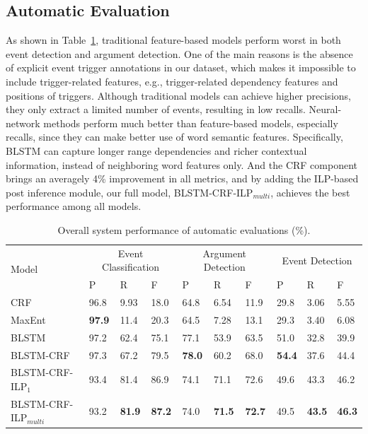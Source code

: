 \subsection{Automatic Evaluation}
As shown in Table~\ref{tab:1}, traditional feature-based models perform worst in both event detection and argument detection. 
One of the main reasons is the absence of explicit event trigger annotations in our dataset, which makes it impossible to include trigger-related features, e.g., trigger-related dependency features and positions of triggers. 
Although traditional models can achieve higher precisions, they only extract a limited number of events, resulting in low recalls. 
Neural-network methods perform much better than feature-based models, especially recalls, since they can make better use of word semantic features. Specifically, BLSTM can capture longer range dependencies and richer contextual information, instead of neighboring word features only.
And the CRF component brings an averagely 4\% improvement in all metrics, and by adding the ILP-based post inference module, our full model, BLSTM-CRF-ILP$_{multi}$, achieves the best performance among all models. 

\begin{table}[!t]
\centering
\small
\begin{tabular}{|l|p{0.8cm}<{\centering}|p{0.8cm}<{\centering}|p{0.8cm}<{\centering}|p{0.8cm}<{\centering}|p{0.8cm}<{\centering}|p{0.8cm}<{\centering}|p{0.8cm}<{\centering}|p{0.8cm}<{\centering}|p{0.8cm}<{\centering}|} \hline
	\multirow{2}{*}{Model} & \multicolumn{3}{c|}{Event Classification} & \multicolumn{3}{c|}{Argument Detection} &
	\multicolumn{3}{c|}{Event Detection} \\ \cline{2-10}
	 & P & R & F & P & R & F & P & R & F \\ \hline
	CRF & 96.8 & 9.93 & 18.0 & 64.8 & 6.54 & 11.9 & 29.8 & 3.06 & 5.55 \\ \hline
	MaxEnt & \textbf{97.9} & 11.4 & 20.3 & 64.5 & 7.28 & 13.1 & 29.3 & 3.40 & 6.08 \\ \hline
	BLSTM & 97.2 & 62.4 & 75.1 & 77.1 & 53.9 & 63.5 & 51.0 & 32.8 & 39.9  \\ \hline \hline
	BLSTM-CRF & 97.3 & 67.2 & 79.5 & \textbf{78.0} & 60.2 & 68.0  & \textbf{54.4} & 37.6 & 44.4  \\ \hline
	BLSTM-CRF-ILP$_{1}$ & 93.4 & 81.4 & 86.9 & 74.1 & 71.1 & 72.6  & 49.6 & 43.3 & 46.2 \\ \hline
	BLSTM-CRF-ILP$_{multi}$ & 93.2 & \textbf{81.9} & \textbf{87.2} &  74.0 & \textbf{71.5} & \textbf{72.7} & 49.5 & \textbf{43.5} & \textbf{46.3} \\ \hline
\end{tabular}
\caption{Overall system performance of automatic evaluations (\%).  \label{tab:1}}
\end{table}

